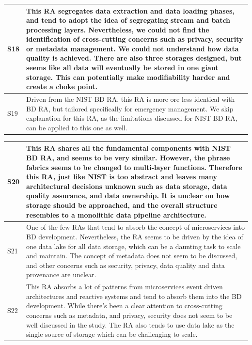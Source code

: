 \documentclass{ieeeaccess}
\begin{document}
\begin{table}
\begin{tabular}{|p{0.3cm}|p{16.8cm}|}
        \hline
        S18 & This RA segregates data extraction and data loading phases, and tend to adopt the idea of segregating stream and batch processing layers. Nevertheless, we could not find the identification of cross-cutting concerns such as privacy, security or metadata management. We could not understand how data quality is achieved. There are also three storages designed, but seems like all data will eventually be stored in one giant storage. This can potentially make modifiability harder and create a choke point. \\
        \hline
        S19 & Driven from the NIST BD RA, this RA is more ore less identical with BD RA, but tailored specifically for emergency management. We skip explanation for this RA, as the limitations discussed for NIST BD RA, can be applied to this one as well. \\
        \hline
    \end{tabular}
\end{table}

\begin{table}
    \renewcommand*{\arraystretch}{1.4}
    \begin{tabular}{|p{0.3cm}|p{16.8cm}|}
        \hline
        S20 & This RA shares all the fundamental components with NIST BD RA, and seems to be very similar. However, the phrase fabrics seems to be changed to multi-layer functions. Therefore this RA, just like NIST is too abstract and leaves many architectural decisions unknown such as data storage, data quality assurance, and data ownership. It is unclear on how storage should be approached, and the overall structure resembles to a monolithic data pipeline architecture. \\
        \hline
        S21 & One of the few RAs that tend to absorb the concept of microservices into BD development. Nevertheless, the RA seems to be driven by the idea of one data lake for all data storage, which can be a daunting task to scale and maintain. The concept of metadata does not seem to be discussed, and other concerns such as security, privacy, data quality and data provenance are unclear.  \\
        \hline
        S22 & This RA absorbs a lot of patterns from microservices event driven architectures and reactive systems and tend to absorb them into the BD development. While there's been a clear attention to cross-cutting concerns such as metadata, and privacy, security does not seem to be well discussed in the study. The RA also tends to use data lake as the single source of storage which can be challenging to scale.  \\
        \hline
    \end{tabular}
\end{table}
\end{document}
